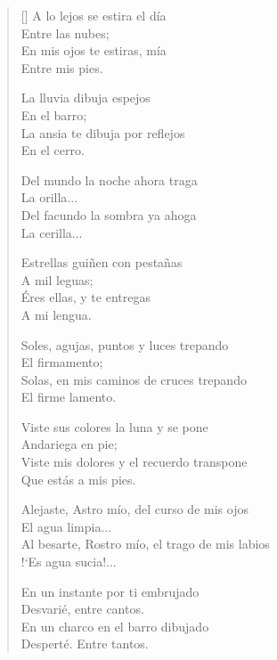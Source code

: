 \documentclass[a4paper,11pt]{article}
\begin{document}
\thispagestyle{empty}


\settowidth{\versewidth}{Al besarte, Rostro mío, el trago de mis labios}

\bigskip

\begin{verse}[\versewidth]
A lo lejos se estira el día \\
\qquad Entre las nubes; \\
En mis ojos te estiras, mía \\
\qquad Entre mis pies.

La lluvia dibuja espejos \\
\qquad En el barro; \\
La ansia te dibuja por reflejos \\
\qquad En el cerro.

Del mundo la noche ahora traga \\
\qquad La orilla... \\
Del facundo la sombra ya ahoga \\
\qquad La cerilla...

Estrellas guiñen con pestañas \\
\qquad A mil leguas; \\
Éres ellas, y te entregas \\
\qquad A mi lengua.

Soles, agujas, puntos y luces trepando \\
\qquad El firmamento; \\
Solas, en mis caminos de cruces trepando \\
\qquad El firme lamento.

Viste sus colores la luna y se pone \\
\qquad Andariega en pie; \\
Viste mis dolores y el recuerdo transpone \\
\qquad Que estás a mis pies.

Alejaste, Astro mío, del curso de mis ojos \\
\qquad El agua limpia... \\
Al besarte, Rostro mío, el trago de mis labios \\
\qquad !`Es agua sucia!...

En un instante por ti embrujado \\
\qquad Desvarié, entre cantos. \\
En un charco en el barro dibujado \\
\qquad Desperté. Entre tantos.
\end{verse}

\end{document}
